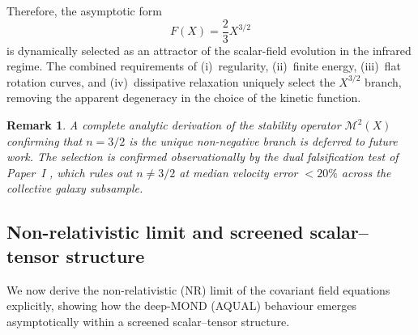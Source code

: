 \documentclass[11pt,a4paper]{article}
\newtheorem{remark}{Remark}[section]
\begin{document}
Therefore, the asymptotic form
\begin{equation}
  F(X) = \frac{2}{3}X^{3/2}
\end{equation}
is dynamically selected as an attractor of the scalar-field evolution in
the infrared regime. The combined requirements of (i)~regularity,
(ii)~finite energy, (iii)~flat rotation curves, and (iv)~dissipative relaxation
uniquely select the $X^{3/2}$ branch, removing the apparent degeneracy in the
choice of the kinetic function.

\begin{remark}
A complete analytic derivation of the stability operator $\mathcal{M}^2(X)$
confirming that $n=3/2$ is the unique non-negative branch is deferred to
future work.  The selection is confirmed observationally by the dual falsification
test of Paper~I \cite{PaperI}, which rules out $n\neq 3/2$ at median velocity
error $<20\%$ across the collective galaxy subsample.
\end{remark}

\subsection{Non-relativistic limit and screened scalar--tensor structure}
\label{subsec:NR_limit}

We now derive the non-relativistic (NR) limit of the covariant field equations
explicitly, showing how the deep-MOND (AQUAL) behaviour emerges asymptotically within a
screened scalar--tensor structure.
\end{document}
